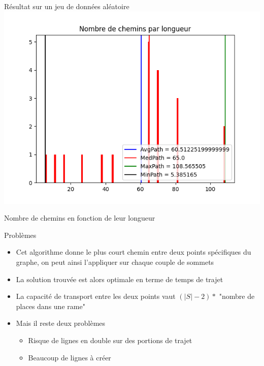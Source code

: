 \documentclass[aspectratio=43,11pt]{beamer}
\begin{document}
\begin{frame}{Résultat sur un jeu de données aléatoire}
    \centering
        \includegraphics[height=0.8\textheight]{sp_r}

    Nombre de chemins en fonction de leur longueur
\end{frame}
\begin{frame}{Problèmes}
    \begin{itemize}
        \item Cet algorithme donne le plus court chemin entre deux points spécifiques du graphe, on peut ainsi l'appliquer sur chaque couple de sommets
        \item La solution trouvée est alors optimale en terme de temps de trajet
        \item La capacité de transport entre les deux points vaut $(|S| - 2) *$ "nombre de places dans une rame"
        \item Mais il reste deux problèmes
        \begin{itemize}
            \item Risque de lignes en double sur des portions de trajet
            \item Beaucoup de lignes à créer
        \end{itemize}
    \end{itemize}
\end{frame}
\end{document}
